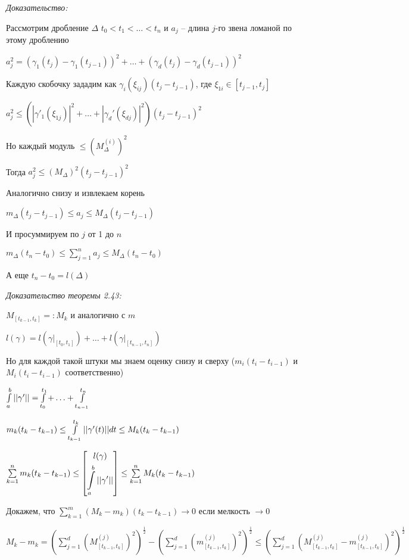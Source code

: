 \documentclass[12pt]{article}
\begin{document}
\textit{Доказательство:}

Рассмотрим дробление $\Delta$ $t_0 < t_1 < \ldots < t_n$ и $a_j$ -- длина $j$-го звена ломаной по этому дроблению

$a_j^2 = (\gamma_1(t_j) - \gamma_1(t_{j - 1}))^2 + \ldots + (\gamma_d(t_j) - \gamma_d(t_{j - 1}))^2$

Каждую скобочку зададим как $\gamma_i(\xi_{ij})(t_j - t_{j - 1})$, где $\xi_{1i} \in [t_{j - 1}, t_j]$

$a_j^2 \leq (|\gamma'_1(\xi_{1j})|^2 + \ldots + |\gamma_d'(\xi_{dj})|^2)(t_j - t_{j - 1})^2$

Но каждый модуль $\leq (M_\Delta^{(i)})^2$

Тогда $a_j^2 \leq (M_\Delta)^2(t_j - t_{j - 1})^2$

Аналогично снизу и извлекаем корень

$m_\Delta(t_j - t_{j - 1}) \leq a_j \leq M_\Delta(t_j - t_{j - 1})$

И просуммируем по $j$ от 1 до $n$

$m_\Delta(t_n - t_0) \leq \sum\limits_{j = 1}^n a_j \leq M_\Delta(t_n - t_0)$

А еще $t_n - t_0 = l(\Delta)$

\textit{Доказательство теоремы 2.43:}

$M_{[t_{k - 1}, t_k]} =: M_k$ и аналогично с $m$

$l(\gamma) = l(\gamma|_{[t_0, t_1]}) + \ldots + l(\gamma|_{[t_{n - 1}, t_n]})$

Но для каждой такой штуки мы знаем оценку снизу и сверху ($m_i(t_i - t_{i - 1})$ и $M_i(t_i - t_{i - 1})$ соответственно)

$\int\limits_a^b || \gamma' || = \int\limits_{t_0}^{t_1} + \ldots + \int\limits_{t_{n - 1}}^{t_n}$

$m_k(t_k - t_{k - 1}) \leq \int\limits_{t_{k - 1}}^{t_k} || \gamma'(t) ||dt \leq M_k(t_k - t_{k - 1})$

$\sum\limits_{k = 1}^n m_k(t_k - t_{k - 1}) \leq \left[ \begin{gathered}
    l(\gamma) \\
    \int\limits_a^b || \gamma' ||
\end{gathered} \right] \leq \sum\limits_{k = 1}^n M_k(t_k - t_{k - 1})$

Докажем, что $\sum\limits_{k = 1}^m (M_k - m_k)(t_k - t_{k - 1}) \to 0$ если мелкость $\to 0$

$M_k - m_k = (\sum\limits_{j = 1}^d (M^{(j)}_{[t_{k - 1}, t_k]})^2)^\frac{1}{2} - (\sum\limits_{j = 1}^d (m^{(j)}_{[t_{k - 1}, t_k]})^2)^\frac{1}{2} \leq (\sum\limits_{j = 1}^d (M^{(j)}_{[t_{k - 1}, t_k]} - m^{(j)}_{[t_{k - 1}, t_k]})^2)^\frac{1}{2}$
\end{document}
